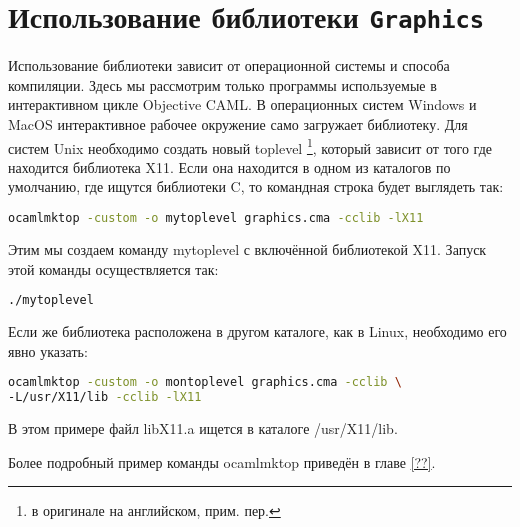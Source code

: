 \section{Использование библиотеки \texttt{Graphics}}
\label{sec:using_the_graphics_module}

Использование библиотеки зависит от операционной системы и способа компиляции.
Здесь мы рассмотрим только программы используемые в интерактивном цикле
Objective CAML. В операционных систем Windows и MacOS интерактивное рабочее
окружение само загружает библиотеку. Для систем Unix необходимо создать новый
toplevel \footnote{в оригинале на английском, прим. пер.}, который зависит от
того где находится библиотека X11. Если она находится в одном из каталогов по
умолчанию, где ищутся библиотеки C, то командная строка будет выглядеть так:

\begin{lstlisting}[language=Bash]
ocamlmktop -custom -o mytoplevel graphics.cma -cclib -lX11
\end{lstlisting}

Этим мы создаем команду mytoplevel с включённой библиотекой X11. Запуск этой
команды осуществляется так:

\begin{lstlisting}[language=Bash]
./mytoplevel
\end{lstlisting}

Если же библиотека расположена в другом каталоге, как в Linux, необходимо его
явно указать:

\begin{lstlisting}[language=Bash]
ocamlmktop -custom -o montoplevel graphics.cma -cclib \
-L/usr/X11/lib -cclib -lX11
\end{lstlisting}

В этом примере файл libX11.a ищется в каталоге /usr/X11/lib.

Более подробный пример команды ocamlmktop приведён в главе \ref{??}.